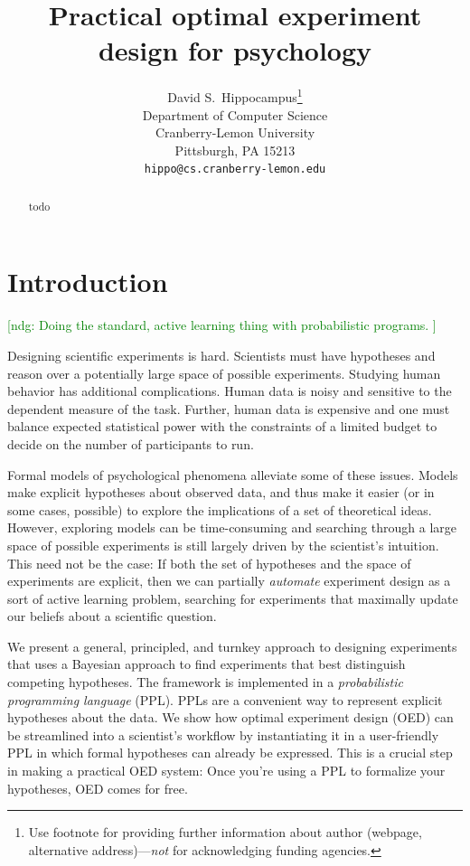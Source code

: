 \documentclass{article}
\title{Practical optimal experiment design for psychology}
\author{
  David S.~Hippocampus\thanks{Use footnote for providing further
    information about author (webpage, alternative
    address)---\emph{not} for acknowledging funding agencies.} \\
  Department of Computer Science\\
  Cranberry-Lemon University\\
  Pittsburgh, PA 15213 \\
  \texttt{hippo@cs.cranberry-lemon.edu} \\
}
\newcommand{\ndg}[1]{\textcolor{Green}{[ndg: #1]}}
\newcommand{\lou}[1]{\textcolor{orange}{[lou: #1]}}
\begin{document}

\maketitle

\begin{abstract}
todo
\end{abstract}

\section{Introduction}
\ndg{Doing the standard, active learning thing with probabilistic programs. }

Designing scientific experiments is hard.
Scientists must have hypotheses and reason over a potentially large space of possible experiments.
Studying human behavior has additional complications.
Human data is noisy and sensitive to the dependent measure of the task.
Further, human data is expensive and one must balance expected statistical power with the constraints of a limited budget to decide on the number of participants to run.

Formal models of psychological phenomena alleviate some of these issues.
Models make explicit hypotheses about observed data, and thus make it easier (or in some cases, possible) to explore the implications of a set of theoretical ideas.
However, exploring models can be time-consuming and searching through a large space of possible experiments is still largely driven by the scientist's intuition.
This need not be the case: If both the set of hypotheses and the space of experiments are explicit, then we can partially \emph{automate} experiment design as a sort of active learning problem, searching for experiments that maximally update our beliefs about a scientific question.

We present a general, principled, and turnkey approach to designing experiments that uses a Bayesian approach to find experiments that best distinguish competing hypotheses.
The framework is implemented in a \emph{probabilistic programming language} (PPL).
PPLs are a convenient way to represent explicit hypotheses about the data.
We show how optimal experiment design (OED) can be streamlined into a scientist's workflow by instantiating it in a user-friendly PPL in which formal hypotheses can already be expressed.
This is a crucial step in making a practical OED system: Once you're using a PPL to formalize your hypotheses, OED comes for free.
\end{document}
